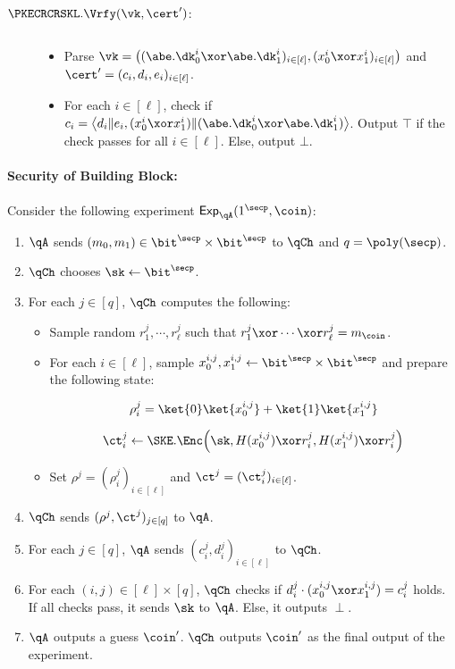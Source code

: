 \begin{description}
\item[$\PKECRCRSKL.\Vrfy(\vk, \cert')$:] $ $
\begin{itemize}
\item Parse $\vk =
\big((\abe.\dk_0^i \xor \abe.\dk_1^i)_{i \in [\ell]}, (x_0^i \xor
x_1^i)_{i \in [\ell]}\big)$ and $\cert' = (c_i, d_i, e_i)_{i \in
[\ell]}$.

\item For each $i \in [\ell]$, check if $c_i = \big\langle d_i
\| e_i, (x_0^i \xor x_1^i) \| (\abe.\dk_0^i \xor
\abe.\dk_1^i)\big\rangle$. Output $\top$ if the check passes for all
$i \in [\ell]$. Else, output $\bot$.
\end{itemize}
\end{description}

\paragraph{Security of Building Block:}
Consider the following experiment $\mathsf{Exp}_\qA(1^\secp,
\coin)$:

\begin{enumerate}
\item $\qA$ sends $(m_0, m_1) \in \bit^\secp \times \bit^\secp$ to
$\qCh$ and $q = \poly(\secp)$.

\item $\qCh$ chooses $\sk \gets \bit^\secp$.

\item For each $j \in [q]$, $\qCh$ computes the following:
\begin{itemize}
\item Sample random $r_1^j, \cdots, r_\ell^j$ such that $r_1^j
\xor \cdots \xor r_\ell^j = m_\coin$.

\item For each $i \in [\ell]$, sample $x_0^{i, j}, x_1^{i, j} \gets
\bit^\secp \times \bit^\secp$ and prepare the following state:

$$\rho_i^j = \ket{0}\ket{x_0^{i,j}} + \ket{1}\ket{x_1^{i, j}}$$

$$\ct_i^j \gets \SKE.\Enc\Big(\sk, H(x_0^{i,j}) \xor r_i^j,
H(x_1^{i,j}) \xor r_i^j\Big)$$

\item Set $\rho^j = (\rho^j_i)_{i \in [\ell]}$ and $\ct^j =
(\ct_i^j)_{i \in [\ell]}$.
\end{itemize}

\item $\qCh$ sends $(\rho^j, \ct^j)_{j \in [q]}$ to $\qA$.

\item For each $j \in [q]$, $\qA$ sends
$(c_i^j, d_i^j)_{i \in [\ell]}$ to $\qCh$.

\item For each $(i, j) \in [\ell]\times[q]$, $\qCh$ checks if
$d_i^j\cdot(x^{i,j}_0 \xor x^{i,j}_1) = c_i^j$ holds. If all checks
pass, it sends $\sk$ to $\qA$. Else, it outputs $\perp$.

\item $\qA$ outputs a guess $\coin'$. $\qCh$ outputs $\coin'$ as the
final output of the experiment.
\end{enumerate}

